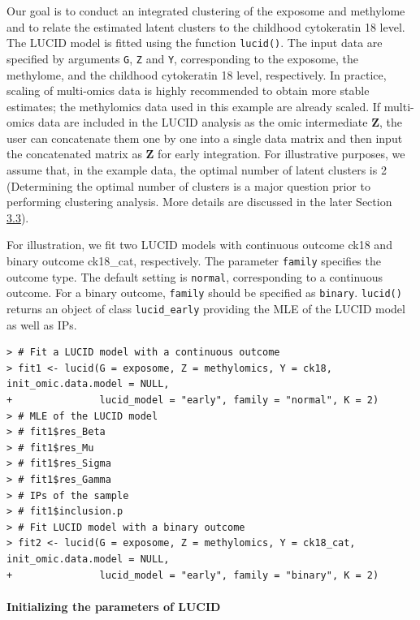 Our goal is to conduct an integrated clustering of the exposome and
methylome and to relate the estimated latent clusters to the childhood
cytokeratin 18 level. The LUCID model is fitted using the function
\texttt{lucid()}. The input data are specified by arguments \texttt{G}, \texttt{Z} and \texttt{Y},
corresponding to the exposome, the methylome, and the childhood
cytokeratin 18 level, respectively. In practice, scaling of multi-omics
data is highly recommended to obtain more stable estimates; the
methylomics data used in this example are already scaled. If multi-omics
data are included in the LUCID analysis as the omic intermediate
\(\boldsymbol{\mathbf{Z}}\), the user can concatenate them one by one into
a single data matrix and then input the concatenated matrix as
\(\boldsymbol{\mathbf{Z}}\) for early integration. For illustrative
purposes, we assume that, in the example data, the optimal number of
latent clusters is 2 (Determining the optimal number of clusters is a
major question prior to performing clustering analysis. More details are
discussed in the later Section \hyperref[sec3.3]{3.3}).

For illustration, we fit two LUCID models with continuous outcome ck18
and binary outcome ck18\_cat, respectively. The parameter \texttt{family}
specifies the outcome type. The default setting is \texttt{normal},
corresponding to a continuous outcome. For a binary outcome, \texttt{family}
should be specified as \texttt{binary}. \texttt{lucid()} returns an object of class
\texttt{lucid\textasciigrave{}\textasciigrave{}\_\textasciigrave{}\textasciigrave{}early} providing the MLE of the LUCID model as well as IPs.

\begin{verbatim}
> # Fit a LUCID model with a continuous outcome
> fit1 <- lucid(G = exposome, Z = methylomics, Y = ck18, init_omic.data.model = NULL,
+               lucid_model = "early", family = "normal", K = 2)
> # MLE of the LUCID model
> # fit1$res_Beta
> # fit1$res_Mu
> # fit1$res_Sigma
> # fit1$res_Gamma
> # IPs of the sample
> # fit1$inclusion.p
> # Fit LUCID model with a binary outcome
> fit2 <- lucid(G = exposome, Z = methylomics, Y = ck18_cat, init_omic.data.model = NULL,
+               lucid_model = "early", family = "binary", K = 2)
\end{verbatim}

\paragraph{Initializing the parameters of LUCID}\label{sec3.1.1}

